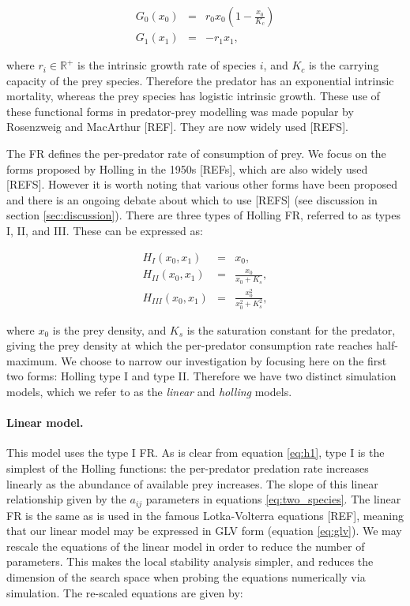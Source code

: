 \begin{eqnarray}
G_0(x_0) &=& r_0x_0\left(1-\frac{x_0}{K_c}\right)  \\
G_1(x_1) &=& -r_1x_1,
\label{eq:two_species}
\end{eqnarray}

where $r_i \in \mathbb{R}^+$ is the intrinsic growth rate of species $i$, and $K_c$ is the carrying capacity of the prey species. Therefore the predator has an exponential intrinsic mortality, whereas the prey species has logistic intrinsic growth. These use of these functional forms in predator-prey modelling was made popular by Rosenzweig and MacArthur [REF]. They are now widely used [REFS]. 

The FR defines the per-predator rate of consumption of prey. We focus on the forms proposed by Holling in the 1950s [REFs], which are also widely used [REFS]. However it is worth noting that various other forms have been proposed and there is an ongoing debate about which to use [REFS] (see discussion in section \ref{sec:discussion}). There are three types of Holling FR, referred to as types I, II, and III. These can be expressed as:

\begin{eqnarray}
H_I(x_0,x_1) &=& x_0,  \label{eq:h1} \\
H_{II}(x_0,x_1) &=& \frac{x_0}{x_0 + K_s},  \label{eq:h2} \\
H_{III}(x_0,x_1) &=& \frac{x_0^2}{x_0^2 + K_s^2},
\end{eqnarray}


where $x_0$ is the prey density, and $K_s$ is the saturation constant for the predator, giving the prey density at which the per-predator consumption rate reaches half-maximum. We choose to narrow our investigation by focusing here on the first two forms: Holling type I and type II. Therefore we have two distinct simulation models, which we refer to as the \emph{linear} and \emph{holling} models.

\paragraph*{Linear model.} 
This model uses the type I FR. As is clear from equation \ref{eq:h1}, type I is the simplest of the Holling functions: the per-predator predation rate increases linearly as the abundance of available prey increases. The slope of this linear relationship given by the $a_{ij}$ parameters in equations \ref{eq:two_species}. The linear FR is the same as is used in the famous Lotka-Volterra equations [REF], meaning that our linear model may be expressed in GLV form (equation \ref{eq:glv}). We may rescale the equations of the linear model in order to reduce the number of parameters. This makes the local stability analysis simpler, and reduces the dimension of the search space when probing the equations numerically via simulation. The re-scaled equations are given by:

